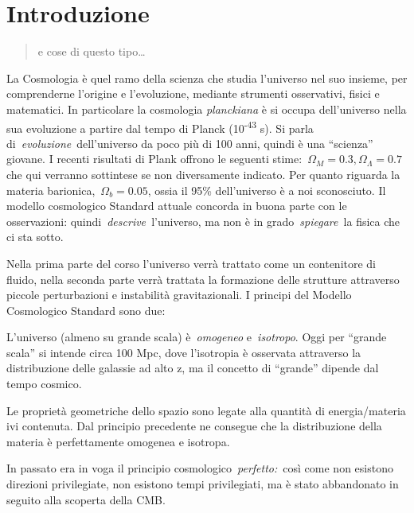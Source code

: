 \chapter{Introduzione}\label{1:chintro}

\begin{quote}
e cose di questo tipo\ldots{}
\end{quote}

La Cosmologia è quel ramo della scienza che studia l'universo nel suo
insieme, per comprenderne l'origine e l'evoluzione, mediante strumenti
osservativi, fisici e matematici. In particolare la
cosmologia \emph{planckiana} è si occupa dell'universo nella sua
evoluzione a partire dal tempo di Planck (10\textsuperscript{-43} s). Si
parla di~\emph{evoluzione}~dell'universo da poco più di 100 anni, quindi
è una ``scienza'' giovane. I recenti risultati di Plank offrono le
seguenti stime:~\(\Omega_{M}=0.3, \Omega_{\Lambda}=0.7\) che qui verranno sottintese se non
diversamente indicato. Per quanto riguarda la materia
barionica,~\(\Omega_b=0.05\), ossia il 95\% dell'universo è a noi
sconosciuto. Il modello cosmologico Standard attuale concorda in buona
parte con le osservazioni: quindi~\emph{descrive~}l'universo, ma non è
in grado~\emph{spiegare~}la fisica che ci sta sotto.

Nella prima parte del corso l'universo verrà trattato come un
contenitore di fluido, nella seconda parte verrà trattata la formazione
delle strutture attraverso piccole perturbazioni e instabilità
gravitazionali. I principi del Modello Cosmologico Standard sono due:

\begin{theorem}
L'universo (almeno su grande scala) è~\emph{omogeneo} e~\emph{isotropo}.
Oggi per ``grande scala'' si intende circa 100 Mpc, dove l'isotropia è
osservata attraverso la distribuzione delle galassie ad alto z, ma il
concetto di ``grande'' dipende dal tempo cosmico.\label{th:princ1}
\end{theorem}

\begin{theorem}
Le proprietà geometriche dello spazio sono legate alla quantità di
energia/materia ivi contenuta. Dal principio precedente ne consegue che
la distribuzione della materia è perfettamente omogenea e isotropa.\label{th:princ2}
\end{theorem}
In passato era in voga il principio cosmologico~\emph{perfetto:}~così
come non esistono direzioni privilegiate, non esistono tempi
privilegiati, ma è stato abbandonato in seguito alla scoperta della
CMB.

